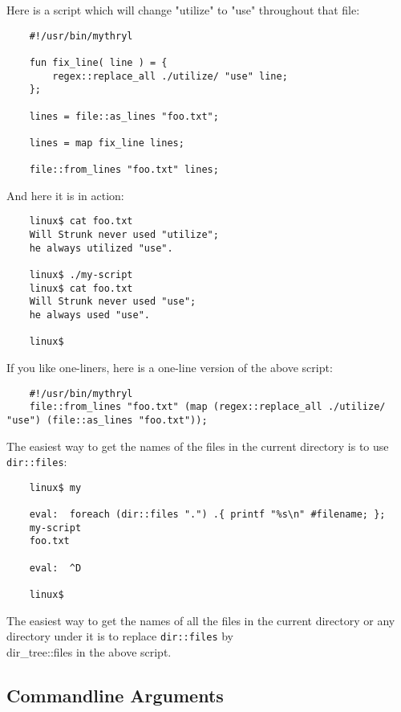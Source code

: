 Here is a script which will change "utilize" to "use" 
throughout that file: 

\begin{verbatim}
    #!/usr/bin/mythryl

    fun fix_line( line ) = {
        regex::replace_all ./utilize/ "use" line;
    };

    lines = file::as_lines "foo.txt";

    lines = map fix_line lines;

    file::from_lines "foo.txt" lines;
\end{verbatim}

And here it is in action:

\begin{verbatim}
    linux$ cat foo.txt
    Will Strunk never used "utilize";
    he always utilized "use".

    linux$ ./my-script
    linux$ cat foo.txt
    Will Strunk never used "use";
    he always used "use".

    linux$
\end{verbatim}

If you like one-liners, here is a one-line version of the above script:

\begin{verbatim}
    #!/usr/bin/mythryl
    file::from_lines "foo.txt" (map (regex::replace_all ./utilize/ "use") (file::as_lines "foo.txt"));
\end{verbatim}

The easiest way to get the names of the files in the current 
directory is to use {\tt dir::files}:

\begin{verbatim}
    linux$ my

    eval:  foreach (dir::files ".") .{ printf "%s\n" #filename; };
    my-script
    foo.txt

    eval:  ^D

    linux$
\end{verbatim}

The easiest way to get the names of all the files in the 
current directory or any directory under it is to replace 
{\tt dir::files} by {\\dir\_tree::files} in the above script.

\cutend*


\subsection{Commandline Arguments}

